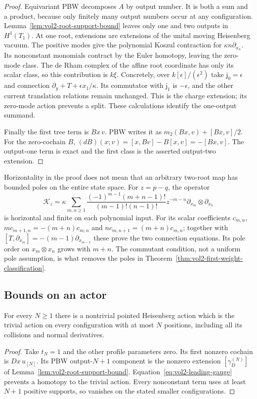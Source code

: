 \begin{proof}
Equivariant PBW decomposes $A$ by output number. It is both a
sum and a product, because only finitely many output numbers
occur at any configuration. Lemma~\ref{lem:vol2-root-support-bound}
leaves only one and two outputs in $H^1(T_1)$. At one root,
extensions are extensions of the unital moving Heisenberg
vacuum. The positive modes give the polynomial Koszul
contraction for $\kappa n\partial_{x_n}$. Its nonconstant
monomials contract by the Euler homotopy, leaving the zero-mode
class. The de Rham complex of the affine root coordinate has
only its scalar class, so this contribution is $k\xi$.
Concretely, over $k[\epsilon]/(\epsilon^2)$ take
$\mathsf j_0=\epsilon$ and connection
$\partial_y+T+\epsilon x_1/\kappa$. Its commutator with
$\mathsf j_1$ is $-\epsilon$, and the other current translation
relations remain unchanged. This is the charge extension;
its zero-mode action prevents a split. These calculations
identify the one-output summand.

Finally the first tree term is $Bx\,v$. PBW writes it as
$m_2(Bx,v)+[Bx,v]/2$. For the zero-cochain $B$,
$(dB)(x;v)=[x,Bv]-B[x,v]=-[Bx,v]$.
The output-one term is exact and the first class is the
asserted output-two extension.
\end{proof}

Horizontality in the proof does not mean that an arbitrary
two-root map has bounded poles on the entire state space.
For $z=p-q$, the operator
\begin{equation}\label{eq:vol2-horizontal-poles}
 \mathcal K_z=\kappa\sum_{m,n\geq1}
  \frac{(-1)^{m-1}(m+n-1)!}{(m-1)!(n-1)!}
      z^{-m-n}\partial_{x_m}\otimes\partial_{x_n}
\end{equation}
is horizontal and finite on each polynomial input. For its
scalar coefficients $c_{m,n}$,
$m c_{m+1,n}=-(m+n)c_{m,n}$ and
$n c_{m,n+1}=(m+n)c_{m,n}$; together with
$[T,\partial_{x_m}]=-(m-1)\partial_{x_{m-1}}$ these prove
the two connection equations. Its pole order on
$x_m\otimes x_n$ grows with $m+n$. The commutant condition,
not a uniform pole assumption, is what removes the poles in
Theorem~\ref{thm:vol2-first-weight-classification}.

\subsection{Bounds on an actor}

\begin{corollary}\label{cor:vol2-unbounded-arity-actions}
For every $N\geq1$ there is a nontrivial pointed Heisenberg
action which is the trivial action on every configuration with
at most $N$ positions, including all its collisions and normal
derivatives.
\end{corollary}
\begin{proof}
Take $t_N=1$ and the other profile parameters zero. Its first
nonzero cochain is $Dx\,u_{[N]}$. Its PBW output-$N+1$
component is the nonzero extension
$[\gamma_D^{(N)}]$ of
Lemma~\ref{lem:vol2-root-support-bound}.
Equation~\eqref{eq:vol2-leading-gauge} prevents a homotopy to
the trivial action. Every nonconstant term uses at least
$N+1$ positive supports, so vanishes on the stated smaller
configurations.
\end{proof}

